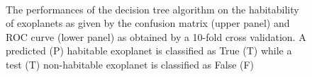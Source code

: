 \documentclass[
12pt, %
a4paper, %
oneside, %
headinclude,footinclude, %
BCOR5mm, %
]{scrartcl}
\begin{document}
\begin{figure}[htp]
  \centering
{}\\
\caption{The performances of the decision tree algorithm on the habitability of exoplanets as given by the confusion matrix (upper panel) and ROC curve (lower panel) as obtained by a 10-fold cross validation. A predicted (P) habitable exoplanet is classified as True (T) while a test (T) non-habitable exoplanet is classified as False (F) }
\label{Decision_tree_performances}
\end{figure}
\end{document}
